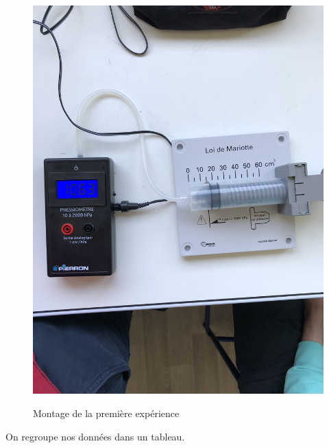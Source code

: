 \documentclass[12pt]{article}
\begin{document}
\begin{figure}[!h]
	\begin{center}
		\includegraphics[scale=0.04]{img/exp1.png}
		\label{Photo exp1}
		\caption{Montage de la première expérience}
	\end{center}
\end{figure}
\newpage
On regroupe nos données dans un tableau.
\end{document}
